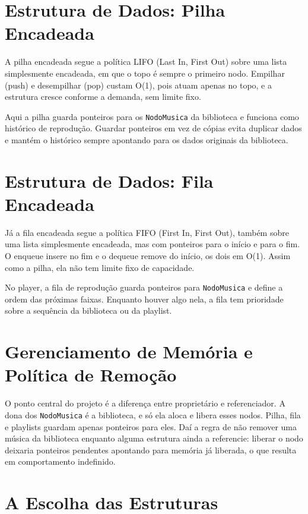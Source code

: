 \documentclass[
    12pt
    ,oneside
    ,a4paper
    ,chapter=TITLE
    ,section=TITLE
    ,sumario=abnt-6027-2012]{abntex2}
\begin{document}
\section{Estrutura de Dados: Pilha Encadeada}

A pilha encadeada segue a política LIFO (Last In, First Out) sobre uma lista simplesmente encadeada, em que o topo é sempre o primeiro nodo. Empilhar (push) e desempilhar (pop) custam O(1), pois atuam apenas no topo, e a estrutura cresce conforme a demanda, sem limite fixo.

Aqui a pilha guarda ponteiros para os \texttt{NodoMusica} da biblioteca e funciona como histórico de reprodução. Guardar ponteiros em vez de cópias evita duplicar dados e mantém o histórico sempre apontando para os dados originais da biblioteca.

\section{Estrutura de Dados: Fila Encadeada}

Já a fila encadeada segue a política FIFO (First In, First Out), também sobre uma lista simplesmente encadeada, mas com ponteiros para o início e para o fim. O enqueue insere no fim e o dequeue remove do início, os dois em O(1). Assim como a pilha, ela não tem limite fixo de capacidade.

No player, a fila de reprodução guarda ponteiros para \texttt{NodoMusica} e define a ordem das próximas faixas. Enquanto houver algo nela, a fila tem prioridade sobre a sequência da biblioteca ou da playlist.

\section{Gerenciamento de Memória e Política de Remoção}

O ponto central do projeto é a diferença entre proprietário e referenciador. A dona dos \texttt{NodoMusica} é a biblioteca, e só ela aloca e libera esses nodos. Pilha, fila e playlists guardam apenas ponteiros para eles. Daí a regra de não remover uma música da biblioteca enquanto alguma estrutura ainda a referencie: liberar o nodo deixaria ponteiros pendentes apontando para memória já liberada, o que resulta em comportamento indefinido.

\section{A Escolha das Estruturas}
\end{document}
